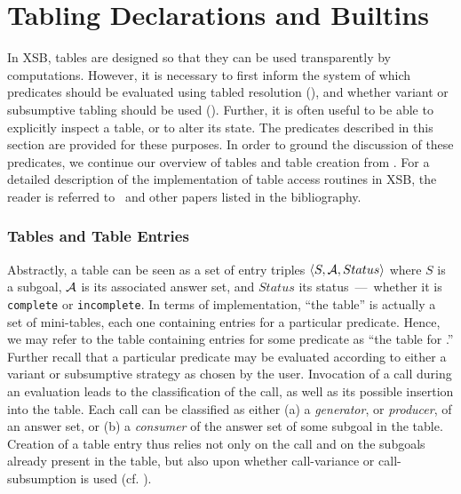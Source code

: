 
\newcommand{\retn}{\code{ret/n}}


\section{Tabling Declarations and Builtins} \label{sec:TablingPredicates}

In XSB, tables are designed so that they can be used transparently by
computations.  However, it is necessary to first inform the system of
which predicates should be evaluated using tabled resolution
(), and whether variant or subsumptive
tabling should be used ().  Further, it
is often useful to be able to explicitly inspect a table, or to alter
its state.  The predicates described in this section are provided for
these purposes.  In order to ground the discussion of these
predicates, we continue our overview of tables and table creation from
.  For a detailed description of the
implementation of table access routines in XSB, the reader is referred
to~\cite{RRSSW98,TST99,CuSW99b} and other papers listed in the
bibliography.


\subsubsection*{Tables and Table Entries}

Abstractly, a table can be seen as a set of entry triples $\langle
S,{\cal A},Status \rangle$ where $S$ is a subgoal, ${\cal A}$ is its associated
answer set, and $Status$ its status~---~whether it is
\texttt{complete} or \texttt{incomplete}.  In terms of implementation,
``the table'' is actually a set of mini-tables, each one containing
entries for a particular predicate.  Hence, we may refer to the table
containing entries for some predicate  as ``the table for
.''  Further recall that a particular predicate may be
evaluated according to either a variant or subsumptive strategy as
chosen by the user.  Invocation of a call during an evaluation leads
to the classification of the call, as well as its possible insertion
into the table.  Each call can be classified as either (a) a
\emph{generator}, or \emph{producer}, of an answer set, or (b) a
\emph{consumer} of the answer set of some subgoal in the table.
Creation of a table entry thus relies not only on the call and on the
subgoals already present in the table, but also upon whether
call-variance or call-subsumption is used (cf. \cite{TST99}).

